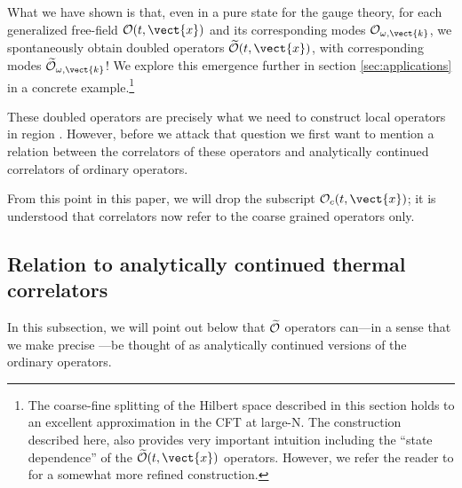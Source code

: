 What we have shown is that, even in a pure state for the gauge theory, for each generalized free-field ${\cal O}(t,\vect{x})$ and its corresponding modes ${\cal O}_{\omega, \vect{k}}$, we spontaneously obtain doubled operators $\widetilde{\cal O}(t,\vect{x})$, with corresponding modes $\widetilde{\cal O}_{\omega, \vect{k}}$! We explore this emergence further in section \ref{sec:applications} in a concrete example.\footnote{The coarse-fine splitting of the Hilbert space described in this section holds to an excellent approximation in the CFT at large-N. The construction described here, also
provides very important intuition including the ``state dependence''
of the $\widetilde{\cal O}(t,\vect{x})$ operators. However, we refer
the reader to \cite{Papadodimas:2013,Papadodimas:2013b} for a somewhat more
refined construction.}

These doubled operators are precisely what we need to construct local operators in region \black. However, before we attack that question we first want to mention a relation between the correlators of these operators and analytically continued correlators of ordinary operators.

From this point in this paper, we will drop the subscript ${\cal O}_c(t, \vect{x})$; it is understood that correlators now refer to the coarse grained operators only.



\subsection{Relation to analytically continued thermal correlators}
In this subsection, we will point out below that  $\widetilde{\cal O}$ operators  can---in a sense that we make precise ---be thought of as analytically continued versions of the ordinary operators. 


